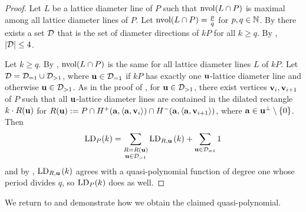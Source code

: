 \begin{proof}
    Let $L$ be a lattice diameter line of $P$ such that $\operatorname{nvol}(L \cap P)$ is maximal among all lattice diameter lines of $P$. Let $\operatorname{nvol}(L \cap P) =\frac{p}{q}$ for $p,q \in \mathbb{N}$. By  there exists a set $\mathcal{D}$ that is the set of diameter directions of $kP$ for all $k\geq q$.
    By \cite[Theorem~4.1]{Alarcon_PhD}, $|\mathcal{D}| \leq 4$.

    Let $k \geq q$. By , $\operatorname{nvol}(L \cap P)$ is the same for all lattice diameter lines $L$ of $kP$. Let $\mathcal{D} = \mathcal{D}_{=1} \cup \mathcal{D}_{>1}$, where $\mathbf{u} \in \mathcal{D}_{=1}$ if $kP$ has exactly one $\mathbf{u}$-lattice diameter line and otherwise $\mathbf{u} \in \mathcal{D}_{>1}$. As in the proof of , for $\mathbf{u} \in \mathcal{D}_{>1}$, there exist vertices $\mathbf{v}_i, \mathbf{v}_{i+1}$ of $P$ such that all $\mathbf{u}$-lattice diameter lines are contained in the dilated rectangle $k\cdot R(\mathbf{u})$ for $R(\mathbf{u}):=P \cap H^+(\mathbf{a},\langle \mathbf{a}, \mathbf{v}_i \rangle) \cap H^-(\mathbf{a},\langle \mathbf{a}, \mathbf{v}_{i+1} \rangle)$, where $\mathbf{a} \in \mathbf{u}^{\perp} \setminus \{0\}$. Then
    \begin{align*}
        \operatorname{LD}_P(k) = \sum_{\substack{R = R(\mathbf{u}) \\ \mathbf{u} \in \mathcal{D}_{>1}}} \operatorname{LD}_{R,\mathbf{u}\,}(k) + \sum_{\substack{\mathbf{u} \in \mathcal{D}_{=1}}} 1
    \end{align*}
    and by , $\operatorname{LD}_{R,\mathbf{u}\,}(k)$ agrees with a quasi-polynomial function of degree one whose period divides $q$, so $\operatorname{LD}_P(k)$ does as well.
\end{proof}

We return to  and demonstrate how we obtain the claimed quasi-polynomial.

